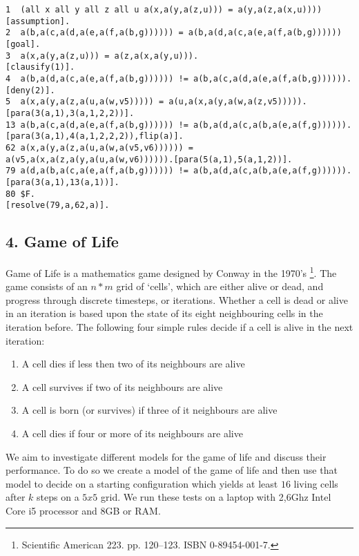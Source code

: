 \documentclass[12pt]{article}
\begin{document}
\begin{lstlisting}
1  (all x all y all z all u a(x,a(y,a(z,u))) = a(y,a(z,a(x,u))))        [assumption].
2  a(b,a(c,a(d,a(e,a(f,a(b,g)))))) = a(b,a(d,a(c,a(e,a(f,a(b,g))))))    [goal].
3  a(x,a(y,a(z,u))) = a(z,a(x,a(y,u))).                                 [clausify(1)].
4  a(b,a(d,a(c,a(e,a(f,a(b,g)))))) != a(b,a(c,a(d,a(e,a(f,a(b,g)))))).  [deny(2)].
5  a(x,a(y,a(z,a(u,a(w,v5))))) = a(u,a(x,a(y,a(w,a(z,v5))))).           [para(3(a,1),3(a,1,2,2))].
13 a(b,a(c,a(d,a(e,a(f,a(b,g)))))) != a(b,a(d,a(c,a(b,a(e,a(f,g)))))).[para(3(a,1),4(a,1,2,2,2)),flip(a)].
62 a(x,a(y,a(z,a(u,a(w,a(v5,v6)))))) = a(v5,a(x,a(z,a(y,a(u,a(w,v6)))))).[para(5(a,1),5(a,1,2))].
79 a(d,a(b,a(c,a(e,a(f,a(b,g)))))) != a(b,a(d,a(c,a(b,a(e,a(f,g)))))).  [para(3(a,1),13(a,1))].
80 $F.                                                                  [resolve(79,a,62,a)].
\end{lstlisting}

\subsection*{4. Game of Life}
Game of Life is a mathematics game designed by Conway in the 1970's
\footnote{Scientific American 223. pp. 120–123. ISBN 0-89454-001-7. }. The game
 consists of an $n*m$ grid of `cells', which are 
either alive or dead, and progress through discrete timesteps, or iterations.
Whether a cell is dead or alive in an iteration is based upon the state of its 
eight neighbouring cells in the iteration before. The following four simple rules
decide if a cell is alive in the next iteration:

\begin{enumerate}
    \item A cell dies if less then two of its neighbours are alive
    \item A cell survives if two of its neighbours are alive
    \item A cell is born (or survives) if three of it neighbours are alive
    \item A cell dies if four or more of its neighbours are alive
\end{enumerate}

We aim to investigate different models for the game of life and discuss their
performance. To do so we create a model of the game of life and then use that 
model to decide on a starting configuration which yields at least $16$ living 
cells after $k$ steps on a $5x5$ grid. We run these tests on a laptop with 
2,6Ghz Intel Core i5 processor and 8GB or RAM.
\end{document}
